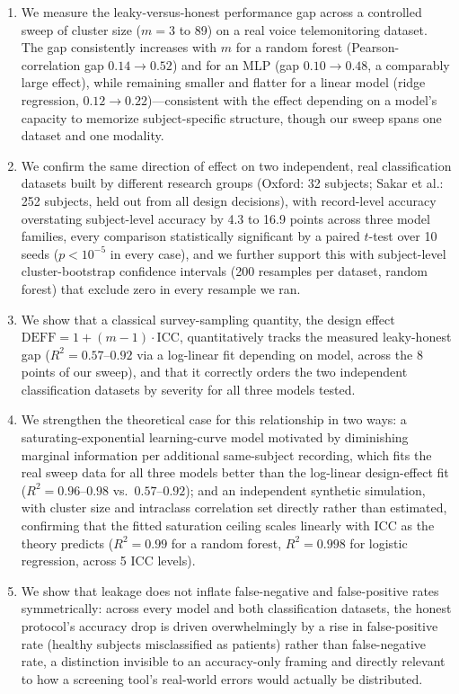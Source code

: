 \documentclass[11pt]{article}
\begin{document}
\begin{enumerate}
\item We measure the leaky-versus-honest performance gap across a controlled sweep of cluster size ($m=3$ to 89) on a real voice telemonitoring dataset. The gap consistently increases with $m$ for a random forest (Pearson-correlation gap $0.14 \to 0.52$) and for an MLP (gap $0.10 \to 0.48$, a comparably large effect), while remaining smaller and flatter for a linear model (ridge regression, $0.12 \to 0.22$)---consistent with the effect depending on a model's capacity to memorize subject-specific structure, though our sweep spans one dataset and one modality.

\item We confirm the same direction of effect on two independent, real classification datasets built by different research groups (Oxford: 32 subjects; Sakar et al.: 252 subjects, held out from all design decisions), with record-level accuracy overstating subject-level accuracy by 4.3 to 16.9 points across three model families, every comparison statistically significant by a paired $t$-test over 10 seeds ($p<10^{-5}$ in every case), and we further support this with subject-level cluster-bootstrap confidence intervals (200 resamples per dataset, random forest) that exclude zero in every resample we ran.

\item We show that a classical survey-sampling quantity, the design effect $\mathrm{DEFF} = 1+(m-1)\cdot\mathrm{ICC}$, quantitatively tracks the measured leaky-honest gap ($R^2 = 0.57$--$0.92$ via a log-linear fit depending on model, across the 8 points of our sweep), and that it correctly orders the two independent classification datasets by severity for all three models tested.

\item We strengthen the theoretical case for this relationship in two ways: a saturating-exponential learning-curve model motivated by diminishing marginal information per additional same-subject recording, which fits the real sweep data for all three models better than the log-linear design-effect fit ($R^2=0.96$--$0.98$ vs.\ $0.57$--$0.92$); and an independent synthetic simulation, with cluster size and intraclass correlation set directly rather than estimated, confirming that the fitted saturation ceiling scales linearly with ICC as the theory predicts ($R^2=0.99$ for a random forest, $R^2=0.998$ for logistic regression, across 5 ICC levels).

\item We show that leakage does not inflate false-negative and false-positive rates symmetrically: across every model and both classification datasets, the honest protocol's accuracy drop is driven overwhelmingly by a rise in false-positive rate (healthy subjects misclassified as patients) rather than false-negative rate, a distinction invisible to an accuracy-only framing and directly relevant to how a screening tool's real-world errors would actually be distributed.


\end{enumerate}
\end{document}
